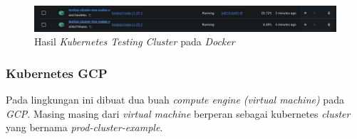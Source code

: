 \begin{figure}[ht]
  \centering
  \includegraphics[width=1\textwidth]{resources/chapter-4/pengujian/kubernetes-lokal-config-result.jpg}
  \caption{Hasil \textit{Kubernetes Testing Cluster} pada \textit{Docker}}
  \label{fig:kubernetes-lokal-config-testing-result}
\end{figure}

\subsubsection{Kubernetes GCP}
\label{subsubsec:kubernetes-gcp}
Pada lingkungan ini dibuat dua buah \textit{compute engine (virtual machine)} pada \textit{GCP}. Masing masing dari \textit{virtual machine} berperan sebagai kubernetes \textit{cluster} yang bernama \textit{prod-cluster-example}.

